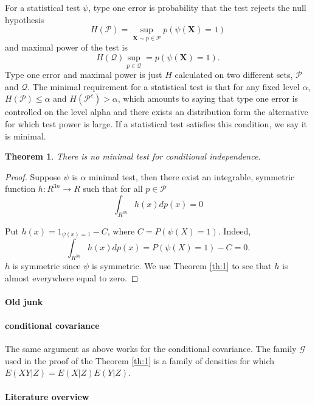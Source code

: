 \documentclass{article}
\newtheorem{Theorem}{Theorem}
\begin{document}
For a statistical test $\psi$, type one error is probability that the test rejects the null hypothesis 
\[
 H(\mathcal{P}) =  \sup_{\mathbf{X} \sim p \in \mathcal{P} }   p( \psi(\mathbf X) =1 )
\]
and maximal power of the test is 
\[
H(\mathcal{Q}) \sup_{p \in \mathcal{Q} }  = p( \psi(\mathbf X) =1 ).
\]
Type one error and maximal power is just $H$  calculated on two different sets,  $\mathcal{P}$ and $\mathcal{Q}$. The minimal requirement for a statistical test is that for any fixed level $\alpha$, $H(\mathcal{P}) \leq \alpha$ and $H(\mathcal{P}^c) > \alpha$, which amounts to saying that type one error is controlled on the level alpha and there exists an distribution form the alternative for which test power is large. If a statistical test satisfies this condition, we say it is minimal. 
\begin{Theorem}
 There is no minimal test for conditional independence.
\end{Theorem}

\begin{proof}
Suppose  $\psi$ is $\alpha$ minimal test, then there exist an integrable, symmetric function $h: R^{3n} \to R$ such that for all $p \in \mathcal{P}$ 
\[
 \int_{R^{3n}} h(x) dp(x) = 0
\]

Put $h(x) = 1_{\psi(x) =1 } - C$, where $C = P( \psi(X) =1)$. Indeed, 
 \[
  \int_{R^{3n}} h(x) dp(x) = P( \psi(X) =1) - C = 0.
 \]
$h$ is symmetric since $\psi$ is symmetric. We use Theorem \ref{th:1} to see that $h$ is almost everywhere equal to zero.
\end{proof}



\paragraph{Old junk}






\paragraph{conditional covariance}
The same argument as above works for the conditional covariance. The family $\mathcal G$ used in the proof of the Theorem \ref{th:1} is a family of densities for which $E(XY|Z)=E(X|Z)E(Y|Z)$. 

\paragraph{Literature overview}
\end{document}
